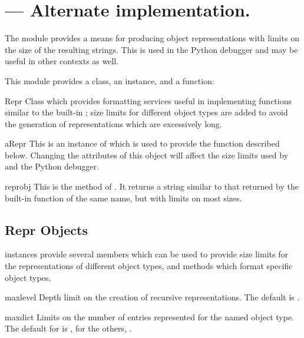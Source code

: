 \section{ ---
         Alternate  implementation.}



The  module provides a means for producing object
representations with limits on the size of the resulting strings.
This is used in the Python debugger and may be useful in other
contexts as well.

This module provides a class, an instance, and a function:


\begin{classdesc}{Repr}{}
  Class which provides formatting services useful in implementing
  functions similar to the built-in ; size limits for 
  different object types are added to avoid the generation of
  representations which are excessively long.
\end{classdesc}


\begin{datadesc}{aRepr}
  This is an instance of  which is used to provide the
   function described below.  Changing the attributes
  of this object will affect the size limits used by 
  and the Python debugger.
\end{datadesc}


\begin{funcdesc}{repr}{obj}
  This is the  method of .  It returns a
  string similar to that returned by the built-in function of the same 
  name, but with limits on most sizes.
\end{funcdesc}


\subsection{Repr Objects \label{Repr-objects}}

 instances provide several members which can be used to
provide size limits for the representations of different object types, 
and methods which format specific object types.


\begin{memberdesc}{maxlevel}
  Depth limit on the creation of recursive representations.  The
  default is .
\end{memberdesc}

\begin{memberdesc}{maxdict}
  Limits on the number of entries represented for the named object
  type.  The default for  is , for the others, 
  .
\end{memberdesc}


